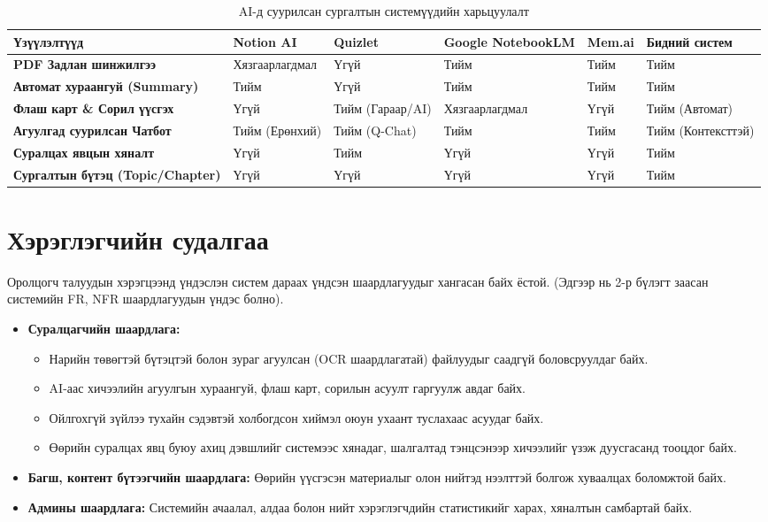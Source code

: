 \begin{longtable}{| p{} | p{} | p{} | p{} | p{} | p{} |}
\caption{AI-д суурилсан сургалтын системүүдийн харьцуулалт}
\label{tab:ai_learning_systems}\\
\hline
{\bfseries Үзүүлэлтүүд} & {\bf Notion AI} & {\bf Quizlet} & {\bf Google NotebookLM} & {\bf Mem.ai} & {\bf Бидний систем} \\ \hline

{\bf PDF Задлан шинжилгээ} & Хязгаарлагдмал & Үгүй & Тийм & Тийм & Тийм \\ \hline

{\bf Автомат хураангуй (Summary)} & Тийм & Үгүй & Тийм & Тийм & Тийм \\ \hline

{\bf Флаш карт \& Сорил үүсгэх} & Үгүй & Тийм (Гараар/AI) & Хязгаарлагдмал & Үгүй & Тийм (Автомат) \\ \hline

{\bf Агуулгад суурилсан Чатбот} & Тийм (Ерөнхий) & Тийм (Q-Chat) & Тийм & Тийм & Тийм (Контексттэй) \\ \hline

{\bf Суралцах явцын хяналт} & Үгүй & Тийм & Үгүй & Үгүй & Тийм \\ \hline

{\bf Сургалтын бүтэц (Topic/Chapter)} & Үгүй & Үгүй & Үгүй & Үгүй & Тийм \\ \hline
\end{longtable}

\section{Хэрэглэгчийн судалгаа}
Оролцогч талуудын хэрэгцээнд үндэслэн систем дараах үндсэн шаардлагуудыг хангасан байх ёстой. (Эдгээр нь 2-р бүлэгт заасан системийн FR, NFR шаардлагуудын үндэс болно).
\begin{itemize}
    \item \textbf{Суралцагчийн шаардлага:} 
    \begin{itemize}
        \item Нарийн төвөгтэй бүтэцтэй болон зураг агуулсан (OCR шаардлагатай) файлуудыг саадгүй боловсруулдаг байх.
        \item AI-аас хичээлийн агуулгын хураангуй, флаш карт, сорилын асуулт гаргуулж авдаг байх.
        \item Ойлгохгүй зүйлээ тухайн сэдэвтэй холбогдсон хиймэл оюун ухаант туслахаас асуудаг байх.
        \item Өөрийн суралцах явц буюу ахиц дэвшлийг системээс хянадаг, шалгалтад тэнцсэнээр хичээлийг үзэж дуусгасанд тооцдог байх.
    \end{itemize}
    \item \textbf{Багш, контент бүтээгчийн шаардлага:} Өөрийн үүсгэсэн материалыг олон нийтэд нээлттэй болгож хуваалцах боломжтой байх.
    \item \textbf{Админы шаардлага:} Системийн ачаалал, алдаа болон нийт хэрэглэгчдийн статистикийг харах, хяналтын самбартай байх.
\end{itemize}

